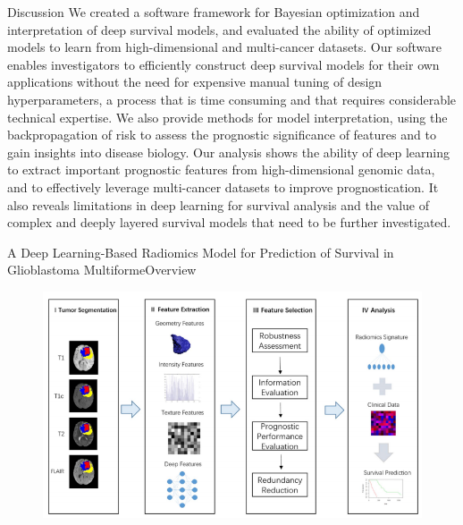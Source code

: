 \documentclass[
]{beamer}
\begin{document}
	\begin{frame}{Discussion}
		We created a software framework for Bayesian optimization and interpretation of deep survival models, and evaluated
		the ability of optimized models to learn from high-dimensional and multi-cancer datasets. Our software
		enables investigators to efficiently construct deep survival models for their own applications without the need for
		expensive manual tuning of design hyperparameters, a process that is time consuming and that requires considerable
		technical expertise. We also provide methods for model interpretation, using the backpropagation of risk to
		assess the prognostic significance of features and to gain insights into disease biology. Our analysis shows the ability
		of deep learning to extract important prognostic features from high-dimensional genomic data, and to effectively
		leverage multi-cancer datasets to improve prognostication. It also reveals limitations in deep learning for
		survival analysis and the value of complex and deeply layered survival models that need to be further investigated.
	\end{frame}
	
	\begin{frame}{A Deep Learning-Based Radiomics
			Model for Prediction of Survival in
			Glioblastoma Multiforme}{Overview}
		\begin{figure}
			\includegraphics[scale=0.5]{over2}
		\end{figure}
	\end{frame}
	
\end{document}
